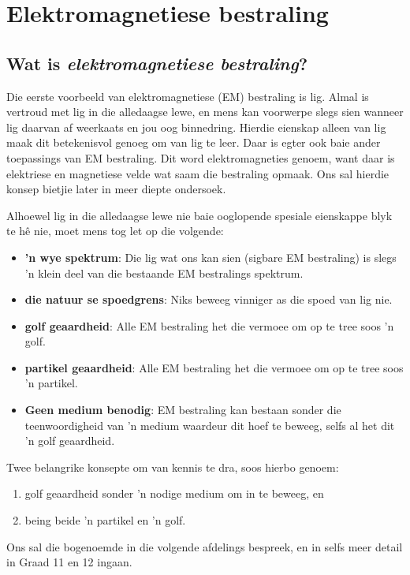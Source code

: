 \chapter{Elektromagnetiese bestraling}
    \setcounter{figure}{1}
    \setcounter{subfigure}{1}
    \label{459e2bef85baf867f5850bc8338cad3a}
         \section{Wat is \textsl{elektromagnetiese bestraling}?}
    \nopagebreak
  Die eerste voorbeeld van elektromagnetiese (EM) bestraling is lig. Almal is vertroud met lig in die alledaagse lewe, en mens kan voorwerpe slegs sien wanneer lig daarvan af weerkaats en jou oog binnedring. Hierdie eienskap alleen van lig maak dit betekenisvol genoeg om van lig te leer. Daar is egter ook baie ander toepassings van EM bestraling. Dit word elektromagneties genoem, want daar is elektriese en magnetiese velde wat saam die bestraling opmaak. Ons sal hierdie konsep bietjie later in meer diepte ondersoek. 


  Alhoewel lig in die alledaagse lewe nie baie ooglopende spesiale eienskappe blyk te h\^e nie, moet mens tog let op die volgende: 
\begin{itemize}
 \item \textbf{'n wye spektrum}: Die lig wat ons kan sien (sigbare EM bestraling) is slegs 'n klein deel van die bestaande EM bestralings spektrum. 
 \item \textbf{die natuur se spoedgrens}: Niks beweeg vinniger as die spoed van lig nie.  
 \item \textbf{golf geaardheid}: Alle EM bestraling het die vermoee om op te tree soos 'n golf. 
 \item \textbf{partikel geaardheid}: Alle EM bestraling het die vermoee om op te tree soos 'n partikel.
 \item \textbf{Geen medium benodig}: EM bestraling kan bestaan sonder die teenwoordigheid van 'n medium waardeur dit hoef te beweeg, selfs al het dit 'n golf geaardheid.
\end{itemize}

Twee belangrike konsepte om van kennis te dra, soos hierbo genoem:
\begin{enumerate}[noitemsep, label=\textbf{\arabic*}. ]
 \item golf geaardheid sonder 'n nodige medium om in te beweeg, en 
 \item being beide 'n partikel en 'n golf. 
\end{enumerate}
Ons sal die bogenoemde in die volgende afdelings bespreek, en in selfs meer detail in Graad 11 en 12 ingaan. 

